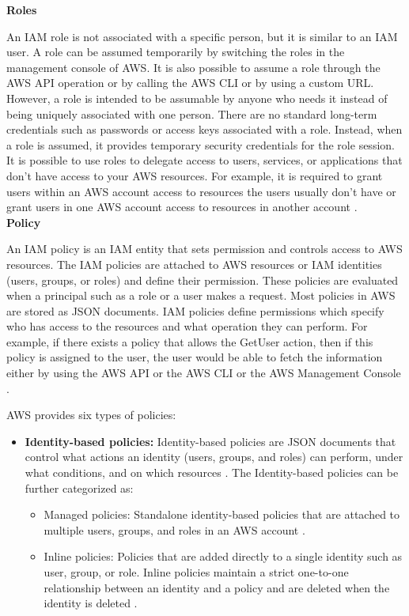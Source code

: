 \textbf{Roles}
\par An IAM role is not associated with a specific person,
but it is similar to an IAM user. A role can be assumed
temporarily by switching the roles in the management
console of AWS. It is also possible to assume a role
through the AWS API operation or by calling the AWS CLI
or by using a custom URL. However, a role is intended to be assumable by anyone who needs it instead of being uniquely associated with one person. There are no standard long-term credentials such as passwords or access keys associated with a role. Instead, when a role is assumed, it provides temporary security credentials for the role session. It is possible to use roles to delegate access to users, services, or applications that don't have access to your AWS resources. For example, it is required to grant users within an AWS account access to resources the users usually don’t have or grant users in one AWS account access to resources in another account \cite{25}. \\

\hfill \break
\textbf{Policy}

\par An IAM policy is an IAM entity that sets permission and controls access to AWS resources. The IAM policies are attached to AWS resources or IAM identities (users, groups, or roles) and define their permission.
These policies are evaluated when a principal such as a role or a user makes a request. Most policies in AWS are stored as JSON documents. IAM policies define permissions which specify who has access to the resources and what operation they can perform. For example, if there exists a policy that allows the GetUser action, then if this policy is assigned to the user, the user would be able to fetch the information either by using the AWS API or the AWS CLI or the AWS Management Console \cite{14}.

\par AWS provides six types of policies:

\begin{itemize}
    \item \textbf{Identity-based policies:} Identity-based policies are JSON documents that control what actions an
    identity
    (users, groups, and roles) can perform, under what conditions, and on which resources \cite{25}. The Identity-based policies can be further categorized as:
    \begin{itemize}
        \item Managed policies: Standalone identity-based policies that are attached to multiple users, groups, and
        roles in an AWS account \cite{25}.
    \end{itemize}
    \begin{itemize}
        \item Inline policies:  Policies that are added directly to a single identity such as user, group, or role.
        Inline policies maintain a strict one-to-one relationship between an identity and a policy and are deleted when the identity is deleted \cite{25}.
    \end{itemize}
\end{itemize}


